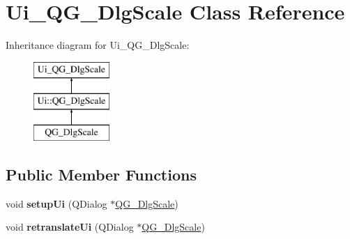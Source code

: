 \hypertarget{classUi__QG__DlgScale}{\section{Ui\-\_\-\-Q\-G\-\_\-\-Dlg\-Scale Class Reference}
\label{classUi__QG__DlgScale}
}
Inheritance diagram for Ui\-\_\-\-Q\-G\-\_\-\-Dlg\-Scale\-:\begin{figure}[H]
\begin{center}
\leavevmode
\includegraphics[height=3.000000cm]{classUi__QG__DlgScale}
\end{center}
\end{figure}
\subsection*{Public Member Functions}
\begin{DoxyCompactItemize}
\item 
\hypertarget{classUi__QG__DlgScale_a5677599bcbdf0d891b868457782c0e62}{void {\bfseries setup\-Ui} (Q\-Dialog $\ast$\hyperlink{classQG__DlgScale}{Q\-G\-\_\-\-Dlg\-Scale})}\label{classUi__QG__DlgScale_a5677599bcbdf0d891b868457782c0e62}

\item 
\hypertarget{classUi__QG__DlgScale_a96cbfee2cc8d774cf5622d79434b514e}{void {\bfseries retranslate\-Ui} (Q\-Dialog $\ast$\hyperlink{classQG__DlgScale}{Q\-G\-\_\-\-Dlg\-Scale})}\label{classUi__QG__DlgScale_a96cbfee2cc8d774cf5622d79434b514e}

\end{DoxyCompactItemize}
